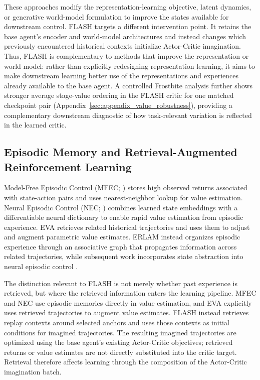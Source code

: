 \documentclass{article} %
\begin{document}
These approaches modify the representation-learning objective, latent dynamics, or generative world-model formulation to improve the states available for downstream control. FLASH targets a different intervention point. It retains the base agent's encoder and world-model architectures and instead changes which previously encountered historical contexts initialize Actor-Critic imagination. Thus, FLASH is complementary to methods that improve the representation or world model: rather than explicitly redesigning representation learning, it aims to make downstream learning better use of the representations and experiences already available to the base agent. A controlled Frostbite analysis further shows stronger average stage-value ordering in the FLASH critic for one matched checkpoint pair (Appendix~\ref{sec:appendix_value_robustness}), providing a complementary downstream diagnostic of how task-relevant variation is reflected in the learned critic.

\subsection{Episodic Memory and Retrieval-Augmented Reinforcement Learning}

Model-Free Episodic Control (MFEC; \citealp{blundell2016model}) stores high observed returns associated with state-action pairs and uses nearest-neighbor lookup for value estimation. Neural Episodic Control (NEC; \citealp{pritzel2017neural}) combines learned state embeddings with a differentiable neural dictionary to enable rapid value estimation from episodic experience. EVA \citep{hansen2018fast} retrieves related historical trajectories and uses them to adjust and augment parametric value estimates. ERLAM \citep{zhu2020episodic} instead organizes episodic experience through an associative graph that propagates information across related trajectories, while subsequent work incorporates state abstraction into neural episodic control \citep{li2023neural}.

The distinction relevant to FLASH is not merely whether past experience is retrieved, but where the retrieved information enters the learning pipeline. MFEC and NEC use episodic memories directly in value estimation, and EVA explicitly uses retrieved trajectories to augment value estimates. FLASH instead retrieves replay contexts around selected anchors and uses those contexts as initial conditions for imagined trajectories. The resulting imagined trajectories are optimized using the base agent's existing Actor-Critic objectives; retrieved returns or value estimates are not directly substituted into the critic target. Retrieval therefore affects learning through the composition of the Actor-Critic imagination batch.
\end{document}
